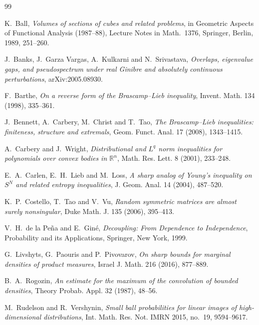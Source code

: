 \documentclass[11pt]{amsart}
\numberwithin{equation}{section}
\theoremstyle{definition}
\theoremstyle{remark}
\newcommand{\R}{\mathbb R}
\newcommand{\1}{\mathbf 1}
\begin{document}
\begin{thebibliography}{99}

 K.~Ball, \emph{Volumes of sections of cubes and related problems}, in Geometric Aspects of Functional Analysis (1987--88), Lecture Notes in Math.~1376, Springer, Berlin, 1989, 251--260.

 J.~Banks, J.~Garza Vargas, A.~Kulkarni and N.~Srivastava, \emph{Overlaps, eigenvalue gaps, and pseudospectrum under real Ginibre and absolutely continuous perturbations}, arXiv:2005.08930.

 F.~Barthe, \emph{On a reverse form of the Brascamp--Lieb inequality}, Invent. Math. 134 (1998), 335--361.

 J.~Bennett, A.~Carbery, M.~Christ and T.~Tao, \emph{The Brascamp--Lieb inequalities: finiteness, structure and extremals}, Geom. Funct. Anal. 17 (2008), 1343--1415.

 A.~Carbery and J.~Wright, \emph{Distributional and $L^q$ norm inequalities for polynomials over convex bodies in $\R^n$}, Math. Res. Lett. 8 (2001), 233--248.

 E.~A.~Carlen, E.~H.~Lieb and M.~Loss, \emph{A sharp analog of Young's inequality on $S^N$ and related entropy inequalities}, J. Geom. Anal. 14 (2004), 487--520.

 K.~P.~Costello, T.~Tao and V.~Vu, \emph{Random symmetric matrices are almost surely nonsingular}, Duke Math. J. 135 (2006), 395--413.

 V.~H.~de la Pe\~na and E.~Gin\'e, \emph{Decoupling: From Dependence to Independence}, Probability and its Applications, Springer, New York, 1999.

 G.~Livshyts, G.~Paouris and P.~Pivovarov, \emph{On sharp bounds for marginal densities of product measures}, Israel J. Math. 216 (2016), 877--889.

 B.~A.~Rogozin, \emph{An estimate for the maximum of the convolution of bounded densities}, Theory Probab. Appl. 32 (1987), 48--56.

 M.~Rudelson and R.~Vershynin, \emph{Small ball probabilities for linear images of high-dimensional distributions}, Int. Math. Res. Not. IMRN 2015, no.~19, 9594--9617.

\end{thebibliography}
\end{document}
